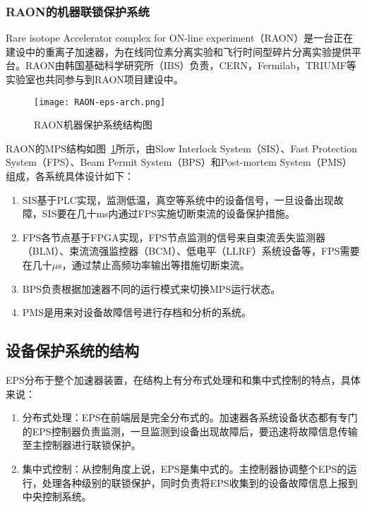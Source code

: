 \subsubsection{RAON的机器联锁保护系统}

Rare isotope Accelerator complex for ON-line experiment（RAON）是一台正在建设中的重离子加速器，为在线同位素分离实验和飞行时间型碎片分离实验提供平台。RAON由韩国基础科学研究所（IBS）负责，CERN，Fermilab，TRIUMF等实验室也共同参与到RAON项目建设中。

\begin{figure}[!htb]
	\centering
	\texttt{[image: RAON-eps-arch.png]}
	\caption{RAON机器保护系统结构图}
	\label{fig:RAON-eps-arch}
\end{figure}

RAON的MPS结构如图~\ref{fig:RAON-eps-arch}所示，由Slow Interlock System（SIS）、Fast Protection System（FPS）、Beam Permit System（BPS）和Post-mortem System（PMS）组成，各系统具体设计如下：

\begin{enumerate}
  \item SIS基于PLC实现，监测低温，真空等系统中的设备信号，一旦设备出现故障，SIS要在几十ms内通过FPS实施切断束流的设备保护措施。

  \item FPS各节点基于FPGA实现，FPS节点监测的信号来自束流丢失监测器（BLM）、束流流强监控器（BCM）、低电平（LLRF）系统设备等，FPS需要在几十$\mu$s，通过禁止高频功率输出等措施切断束流。

  \item BPS负责根据加速器不同的运行模式来切换MPS运行状态。

  \item PMS是用来对设备故障信号进行存档和分析的系统。

\end{enumerate}

\subsection{设备保护系统的结构}

EPS分布于整个加速器装置，在结构上有分布式处理和和集中式控制的特点，具体来说：

\begin{enumerate}
  \item 分布式处理：EPS在前端层是完全分布式的。加速器各系统设备状态都有专门的EPS控制器负责监测，一旦监测到设备出现故障后，要迅速将故障信息传输至主控制器进行联锁保护。
  \item 集中式控制：从控制角度上说，EPS是集中式的。主控制器协调整个EPS的运行，处理各种级别的联锁保护，同时负责将EPS收集到的设备故障信息上报到中央控制系统。
\end{enumerate}

